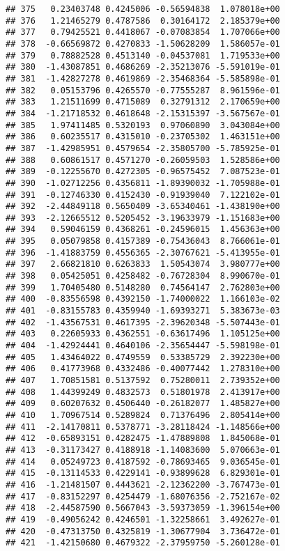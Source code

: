 \documentclass[
]{article}
\begin{document}
\begin{verbatim}
## 375   0.23403748 0.4245006 -0.56594838  1.078018e+00
## 376   1.21465279 0.4787586  0.30164172  2.185379e+00
## 377   0.79425521 0.4418067 -0.07083854  1.707066e+00
## 378  -0.66569872 0.4270833 -1.50628209  1.586057e-01
## 379   0.78882528 0.4513140 -0.04537081  1.719533e+00
## 380  -1.43087851 0.4686269 -2.35213076 -5.591019e-01
## 381  -1.42827278 0.4619869 -2.35468364 -5.585898e-01
## 382   0.05153796 0.4265570 -0.77555287  8.961596e-01
## 383   1.21511699 0.4715089  0.32791312  2.170659e+00
## 384  -1.21718532 0.4618648 -2.15315397 -3.567567e-01
## 385   1.97411485 0.5320193  0.97060890  3.043084e+00
## 386   0.60235517 0.4315010 -0.23705302  1.463151e+00
## 387  -1.42985951 0.4579654 -2.35805700 -5.785925e-01
## 388   0.60861517 0.4571270 -0.26059503  1.528586e+00
## 389  -0.12255670 0.4272305 -0.96575452  7.087523e-01
## 390  -1.02712256 0.4356811 -1.89390032 -1.705988e-01
## 391  -0.12746330 0.4152430 -0.91939040  7.122102e-01
## 392  -2.44849118 0.5650409 -3.65340461 -1.438190e+00
## 393  -2.12665512 0.5205452 -3.19633979 -1.151683e+00
## 394   0.59046159 0.4368261 -0.24596015  1.456363e+00
## 395   0.05079858 0.4157389 -0.75436043  8.766061e-01
## 396  -1.41883759 0.4556365 -2.30767621 -5.413955e-01
## 397   2.66821810 0.6263833  1.50543074  3.980777e+00
## 398   0.05425051 0.4258482 -0.76728304  8.990670e-01
## 399   1.70405480 0.5148280  0.74564147  2.762803e+00
## 400  -0.83556598 0.4392150 -1.74000022  1.166103e-02
## 401  -0.83155783 0.4359940 -1.69393271  5.383673e-03
## 402  -1.43567531 0.4617395 -2.39620348 -5.507443e-01
## 403   0.22605933 0.4362551 -0.63617496  1.105125e+00
## 404  -1.42924441 0.4640106 -2.35654447 -5.598198e-01
## 405   1.43464022 0.4749559  0.53385729  2.392230e+00
## 406   0.41773968 0.4332486 -0.40077442  1.278310e+00
## 407   1.70851581 0.5137592  0.75280011  2.739352e+00
## 408   1.44399249 0.4832573  0.51801978  2.413917e+00
## 409   0.60207632 0.4506440 -0.26182077  1.485827e+00
## 410   1.70967514 0.5289824  0.71376496  2.805414e+00
## 411  -2.14170811 0.5378771 -3.28118424 -1.148566e+00
## 412  -0.65893151 0.4282475 -1.47889808  1.845068e-01
## 413  -0.31173427 0.4188918 -1.14083600  5.070663e-01
## 414   0.05249723 0.4187592 -0.78693465  9.036545e-01
## 415  -0.13114533 0.4229141 -0.93899628  6.829301e-01
## 416  -1.21481507 0.4443621 -2.12362200 -3.767473e-01
## 417  -0.83152297 0.4254479 -1.68076356 -2.752167e-02
## 418  -2.44587590 0.5667043 -3.59373059 -1.396154e+00
## 419  -0.49056242 0.4246501 -1.32258661  3.492627e-01
## 420  -0.47313750 0.4325819 -1.30677904  3.736472e-01
## 421  -1.42150680 0.4679322 -2.37959750 -5.260128e-01

\end{verbatim}
\end{document}
